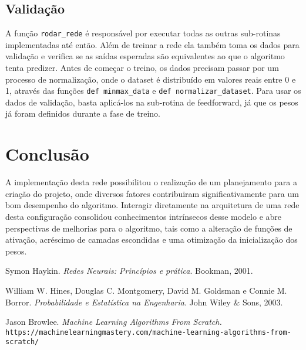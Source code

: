 \documentclass[12pt,a4paper]{article}
\begin{document}
\subsection{Validação}

	A função \verb|rodar_rede| é responsável por executar todas as outras sub-rotinas implementadas até então. Além de treinar a rede ela também toma os dados para validação e verifica se as saídas esperadas são equivalentes ao que o algoritmo tenta predizer.
	Antes de começar o treino, os dados precisam passar por um processo de normalização, onde o dataset é distribuído em valores reais entre 0 e 1, através das funções \verb|def minmax_data| e \verb|def normalizar_dataset|.
	Para usar os dados de validação, basta aplicá-los na sub-rotina de feedforward, já que os pesos já foram definidos durante a fase de treino.\\

\section{Conclusão}
	A implementação desta rede possibilitou o realização de um planejamento para a criação do projeto, onde diversos fatores contribuiram significativamente para um bom desempenho do algoritmo. Interagir diretamente na arquitetura de uma rede desta configuração consolidou conhecimentos intrínsecos desse modelo e abre perspectivas de melhorias para o algoritmo, tais como a alteração de funções de ativação, acréscimo de camadas escondidas e uma otimização da inicialização dos pesos.

\begin{thebibliography}{9}
Symon Haykin.
\textit{Redes Neurais: Princípios e prática}. 
Bookman, 2001.
 
William W. Hines, Douglas C. Montgomery, David M. Goldsman e Connie M. Borror. 
\textit{Probabilidade e Estatística na Engenharia}.
John Wiley \& Sons, 2003.
 
 Jason Browlee.
\textit{Machine Learning Algorithms From Scratch.}
\\\texttt{https://machinelearningmastery.com/machine-learning-algorithms-from-scratch/}

\end{thebibliography}
\end{document}

